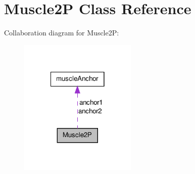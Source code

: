 \hypertarget{class_muscle2_p}{\section{Muscle2\-P Class Reference}
\label{class_muscle2_p}
}


Collaboration diagram for Muscle2\-P\-:\nopagebreak
\begin{figure}[H]
\begin{center}
\leavevmode
\includegraphics[width=158pt]{class_muscle2_p__coll__graph}
\end{center}
\end{figure}
